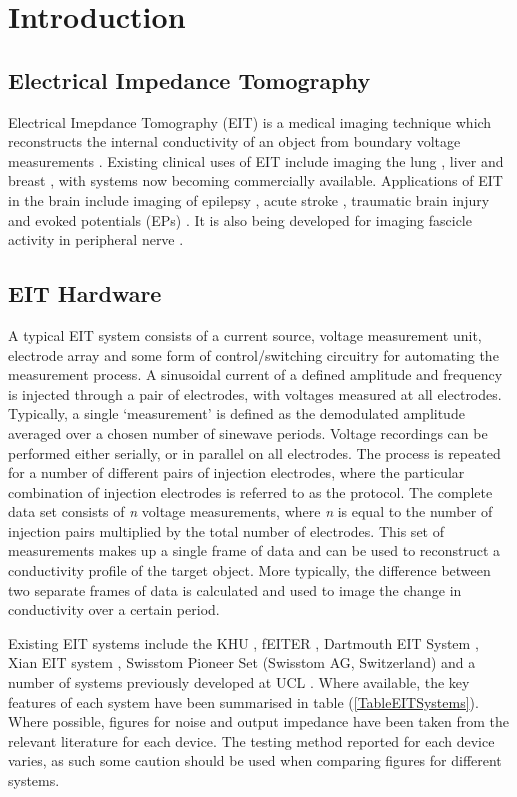 \section{Introduction}

\subsection{Electrical Impedance Tomography}
Electrical Imepdance Tomography (EIT) is a medical imaging technique which reconstructs the internal conductivity of an object from boundary voltage measurements \cite{Metherall1996}. Existing clinical uses of EIT include imaging the lung \cite{Frerichs_2000}, liver \cite{YOU_2009} and breast \cite{Halter}, with systems now becoming commercially available. Applications of EIT in the brain include imaging of epilepsy \cite{Vongerichten_2016,Fabrizi_2006}, acute stroke \cite{Dowrick_2016}, traumatic brain injury \cite{Manwaring2013} and evoked potentials (EPs) \cite{Aristovich_2016}. It is also being developed for imaging fascicle activity in peripheral nerve \cite{KirillStockholm}. 

\subsection{EIT Hardware}

A typical EIT system consists of a current source, voltage measurement unit, electrode array and some form of control/switching circuitry for automating the measurement process. A sinusoidal current of a defined amplitude and frequency is injected through a pair of electrodes, with voltages measured at all electrodes. Typically, a single `measurement' is defined as the demodulated amplitude averaged over a chosen number of sinewave periods. Voltage recordings can be performed either serially, or in parallel on all electrodes. The process is repeated for a number of different pairs of injection electrodes, where the particular combination of injection electrodes is referred to as the protocol. The complete data set consists of \emph{n} voltage measurements, where \emph{n} is equal to the number of injection pairs multiplied by the total number of electrodes. This set of measurements makes up a single frame of data and can be used to reconstruct a conductivity profile of the target object. More typically, the difference between two separate frames of data is calculated and used to image the change in conductivity over a certain period.

Existing EIT systems include the KHU \cite{Hun_Wi_2014}, fEITER \cite{McCann_2011}, Dartmouth EIT System \cite{khan}, Xian EIT system \cite{Shi_Xuetao_2005}, Swisstom Pioneer Set (Swisstom AG, Switzerland) and a number of systems previously developed at UCL \cite{Oh2011} \cite{McEwan_2006}. Where available, the key features of each system have been summarised in table (\ref{TableEITSystems}). Where possible, 
figures for noise and output impedance have been taken from the relevant literature for each device. The testing method reported for each device varies, as such some caution should be used when comparing figures for different systems.
